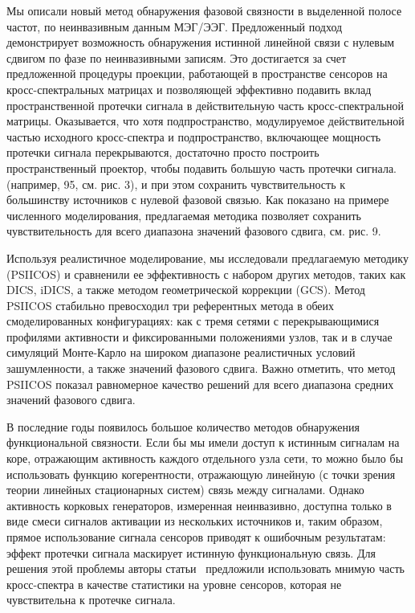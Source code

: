 
Мы описали новый метод обнаружения фазовой связности в выделенной полосе
частот, по неинвазивным данным МЭГ/ЭЭГ. Предложенный подход демонстрирует
возможность обнаружения истинной линейной связи с нулевым сдвигом по фазе по
неинвазивными записям. Это достигается за счет предложенной процедуры
проекции, работающей в пространстве сенсоров на кросс-спектральных матрицах и
позволяющей эффективно подавить вклад пространственной протечки сигнала в
действительную часть кросс-спектральной матрицы. Оказывается, что хотя
подпространство, модулируемое действительной частью исходного кросс-спектра и
подпространство, включающее мощность протечки сигнала перекрываются, достаточно
просто построить пространственный проектор, чтобы подавить большую часть
протечки сигнала.  (например, 95, см. рис. 3), и при этом сохранить
чувствительность к большинству источников с нулевой фазовой связью. Как
показано на примере численного моделирования, предлагаемая методика позволяет
сохранить чувствительность для всего диапазона значений фазового сдвига, см. рис. 9.

Используя реалистичное моделирование, мы исследовали предлагаемую методику
(PSIICOS) и сравненили ее эффективность с набором других методов, таких как
DICS, iDICS, а также методом геометрической коррекции (GCS). Метод PSIICOS
стабильно превосходил три референтных метода в обеих смоделированных конфигурациях:
как с тремя сетями с перекрывающимися профилями активности и фиксированными положениями
узлов, так и в случае симуляций Монте-Карло на широком диапазоне реалистичных
условий зашумленности, а также значений фазового сдвига.  Важно отметить, что
метод PSIICOS показал равномерное качество решений для всего диапазона средних
значений фазового сдвига.

В последние годы появилось большое количество методов обнаружения
функциональной связности.  Если бы мы имели доступ к истинным сигналам на коре,
отражающим активность каждого отдельного узла сети, то можно было бы
использовать функцию когерентности, отражающую линейную (с точки зрения теории
линейных стационарных систем) связь между сигналами.  Однако активность
корковых генераторов, измеренная неинвазивно, доступна только в виде смеси
сигналов активации из нескольких источников и, таким образом, прямое
использование сигнала сенсоров приводят к ошибочным результатам: эффект
протечки сигнала маскирует истинную функциональную связь. Для решения этой
проблемы авторы статьи~\cite{imcoh} предложили использовать мнимую часть
кросс-спектра в качестве статистики на уровне сенсоров, которая не чувствительна к
протечке сигнала.

